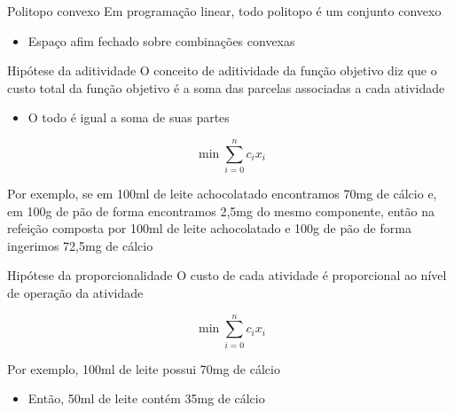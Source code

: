 \documentclass[compress,mathserif]{beamer}
\begin{document}
\begin{frame}{Politopo convexo}
    Em programação linear, todo politopo é um conjunto convexo
    \begin{itemize}
        \item Espaço afim fechado sobre combinações convexas \href{https://pt.wikipedia.org/wiki/Conjunto_convexo}{} 
    \end{itemize}
    
    \begin{center}
    \end{center}
    
\end{frame}


\begin{frame}{Hipótese da aditividade}
O conceito de aditividade da função objetivo diz que o custo total da função objetivo é a soma das parcelas associadas a cada atividade
\begin{itemize}
    \item O todo é igual a soma de suas partes
\end{itemize}

\vspace{0.5cm}
$$\min \sum_{i = 0}^n c_i x_i$$

\vspace{0.5cm}

Por exemplo, se em 100ml de leite achocolatado encontramos
70mg de cálcio e, em 100g de pão de forma encontramos
2,5mg do mesmo componente, então na refeição composta
por 100ml de leite achocolatado e 100g de pão de forma
ingerimos 72,5mg de cálcio
    
\end{frame}


\begin{frame}{Hipótese da proporcionalidade}
O custo de cada atividade é proporcional ao nível de operação da atividade

\vspace{0.5cm}

$$\min \sum_{i = 0}^n c_i x_i$$

\vspace{0.5cm}

Por exemplo, 100ml de leite possui 70mg de cálcio
\begin{itemize}
    \item Então, 50ml de leite contém 35mg de cálcio
\end{itemize}

\end{frame}
\end{document}
